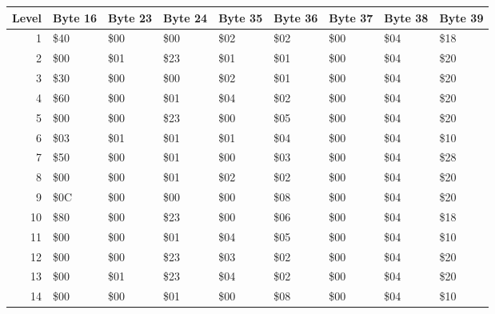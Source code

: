 
\begin{figure}[H]
  {
  \setlength{\tabcolsep}{3.0pt}
  \setlength\cmidrulewidth{\heavyrulewidth} %
  \begin{adjustbox}{width=\textwidth}

\begin{tabular}{rllllllll}
\toprule
   Level & Byte 16   & Byte 23   & Byte 24   & Byte 35   & Byte 36   & Byte 37   & Byte 38   & Byte 39   \\
\midrule
       1 & \$40       & \$00       & \$00       & \$02       & \$02       & \$00       & \$04       & \$18       \\
       2 & \$00       & \$01       & \$23       & \$01       & \$01       & \$00       & \$04       & \$20       \\
       3 & \$30       & \$00       & \$00       & \$02       & \$01       & \$00       & \$04       & \$20       \\
       4 & \$60       & \$00       & \$01       & \$04       & \$02       & \$00       & \$04       & \$20       \\
       5 & \$00       & \$00       & \$23       & \$00       & \$05       & \$00       & \$04       & \$20       \\
       6 & \$03       & \$01       & \$01       & \$01       & \$04       & \$00       & \$04       & \$10       \\
       7 & \$50       & \$00       & \$01       & \$00       & \$03       & \$00       & \$04       & \$28       \\
       8 & \$00       & \$00       & \$01       & \$02       & \$02       & \$00       & \$04       & \$20       \\
       9 & \$0C       & \$00       & \$00       & \$00       & \$08       & \$00       & \$04       & \$20       \\
      10 & \$80       & \$00       & \$23       & \$00       & \$06       & \$00       & \$04       & \$18       \\
      11 & \$00       & \$00       & \$01       & \$04       & \$05       & \$00       & \$04       & \$10       \\
      12 & \$00       & \$00       & \$23       & \$03       & \$02       & \$00       & \$04       & \$20       \\
      13 & \$00       & \$01       & \$23       & \$04       & \$02       & \$00       & \$04       & \$20       \\
      14 & \$00       & \$00       & \$01       & \$00       & \$08       & \$00       & \$04       & \$10       \\

\end{tabular}
\end{adjustbox}}
\end{figure}
